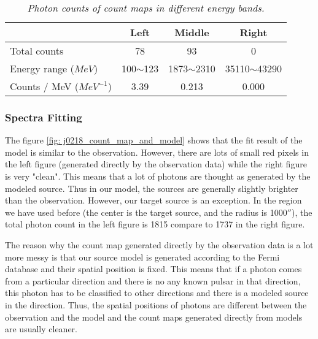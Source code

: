 \documentclass[12pt]{report}
\newcommand{\mycaption}[1]{\caption{\textit{\footnotesize #1}}}
\begin{document}
          \begin{table}[!h]   
            \centering
            \begin{tabular}{|m{4.5cm} | c | c | c |}
              \hline 
              & Left & Middle & Right \\
              \hline
              Total counts & 78 & 93 & 0 \\
              \hline 
              Energy range ($MeV$) & 100$\sim$123 & 1873$\sim$2310 & 35110$\sim$43290 \\ 
              \hline
              Counts / MeV ($MeV^{-1}$)& 3.39 & 0.213 & 0.000 \\  
              \hline
            \end{tabular}
            \mycaption{Photon counts of count maps in different energy bands.}
            \label{table:j0218_ccube_photon_counts}
          \end{table}

          \subsubsection{Spectra Fitting}

            The figure \ref{fig: j0218_count_map_and_model} shows that the fit result of the model 
            is similar to the observation. However, 
            there are lots of small red pixels in the left figure (generated directly by the observation data) while the 
            right figure is very "clean". This means that a lot of photons are thought as generated by the modeled 
            source. Thus in our model, the sources are generally slightly brighter than the observation. However, our target
            source is an exception. In the region we have used before (the center is the target source, and the radius is
            1000$''$), the total photon count in the left figure is 1815 compare to 1737 in the right figure. 

            The reason why the count map generated directly by the observation data is a lot more messy is that our source 
            model is generated according to the Fermi database and their spatial position is fixed. This means that if 
            a photon comes from a particular direction and there is no any known pulsar in that direction, this 
            photon has to be classified to other directions and there is a modeled source in the direction.  
            Thus, the spatial positions of photons are different between the observation and the model and 
            the count maps generated directly from models are usually cleaner. 
            
\end{document}
